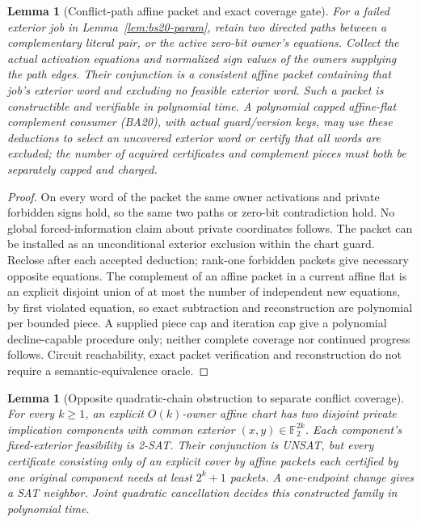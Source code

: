 \documentclass[11pt]{article}
\newtheorem{lemma}[theorem]{Lemma}
\begin{document}
\begin{lemma}[Conflict-path affine packet and exact coverage gate]\label{lem:bs20-learn}
For a failed exterior job in Lemma~\ref{lem:bs20-param}, retain two directed paths between a complementary literal pair, or the active zero-bit owner's equations. Collect the actual activation equations and normalized sign values of the owners supplying the path edges. Their conjunction is a consistent affine packet containing that job's exterior word and excluding no feasible exterior word. Such a packet is constructible and verifiable in polynomial time. A polynomial capped affine-flat complement consumer (BA20), with actual guard/version keys, may use these deductions to select an uncovered exterior word or certify that all words are excluded; the number of acquired certificates and complement pieces must both be separately capped and charged.
\end{lemma}
\begin{proof}
On every word of the packet the same owner activations and private forbidden signs hold, so the same two paths or zero-bit contradiction hold. No global forced-information claim about private coordinates follows. The packet can be installed as an unconditional exterior exclusion within the chart guard. Reclose after each accepted deduction; rank-one forbidden packets give necessary opposite equations. The complement of an affine packet in a current affine flat is an explicit disjoint union of at most the number of independent new equations, by first violated equation, so exact subtraction and reconstruction are polynomial per bounded piece. A supplied piece cap and iteration cap give a polynomial decline-capable procedure only; neither complete coverage nor continued progress follows. Circuit reachability, exact packet verification and reconstruction do not require a semantic-equivalence oracle.
\end{proof}
\begin{lemma}[Opposite quadratic-chain obstruction to separate conflict coverage]\label{lem:bs20-chain}
For every $k\ge1$, an explicit $O(k)$-owner affine chart has two disjoint private implication components with common exterior $(x,y)\in\mathbb F_2^{2k}$. Each component's fixed-exterior feasibility is 2-SAT. Their conjunction is UNSAT, but every certificate consisting only of an explicit cover by affine packets each certified by one original component needs at least $2^k+1$ packets. A one-endpoint change gives a SAT neighbor. Joint quadratic cancellation decides this constructed family in polynomial time.
\end{lemma}
\end{document}
